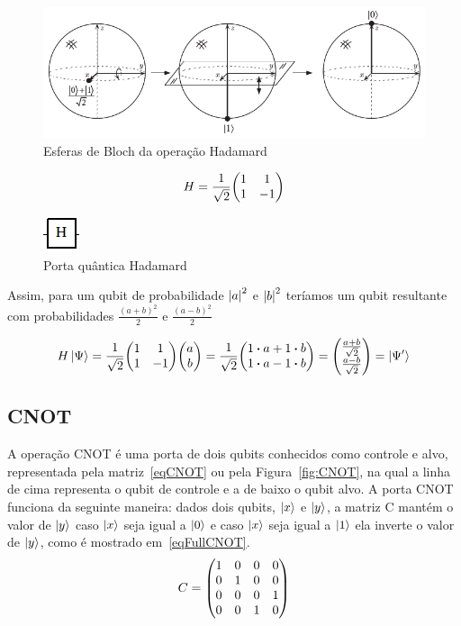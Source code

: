 \documentclass[a4paper, 12pt, oneside]{book}
\begin{document}
\begin{figure}[H]
\centering
\includegraphics[scale=0.6]{h_sphere.png}
\caption{Esferas de Bloch da operação Hadamard}
\label{fig:h_sphere}
\end{figure}

\begin{equation}\label{eqH}
H =  \frac{1}{\sqrt{2}}\mqty(1&1\\1&-1)
\end{equation}

\begin{figure}[H]
\centering
\includegraphics[scale=0.75]{h.jpg}
\caption{Porta quântica Hadamard}
\label{fig:H}
\end{figure}

Assim, para um qubit de probabilidade $\abs{a}^2$ e $\abs{b}^2$ teríamos um qubit resultante com probabilidades $\frac{(a+b)^2}{2}$ e $\frac{(a-b)^2}{2}$

\begin{equation}
H\ket{\Psi} = \frac{1}{\sqrt{2}}\mqty(1&1\\1&-1)\mqty(a\\b) = \frac{1}{\sqrt{2}}\mqty(1 \vdot a+1 \vdot b \\1 \vdot a-1 \vdot b) = \mqty( \frac{a+b}{\sqrt{2}} \\ \frac{a-b}{\sqrt{2}} ) = \ket{\Psi'}
\end{equation}

\subsection{CNOT} \label{sec:cnot}
A operação CNOT é uma porta de dois qubits conhecidos como controle e alvo, representada pela matriz~\eqref{eqCNOT} ou pela Figura~\ref{fig:CNOT}, na qual a linha de cima representa o qubit de controle e a de baixo o qubit alvo. A porta CNOT funciona da seguinte maneira: dados dois qubits, $\ket{x}$ e $\ket{y}$, a matriz C mantém o valor de $\ket{y}$ caso $\ket{x}$ seja igual a $\ket{0}$ e caso $\ket{x}$ seja igual a $\ket{1}$ ela inverte o valor de $\ket{y}$, como é mostrado em~\eqref{eqFullCNOT}.
\begin{equation}\label{eqCNOT}
C =  \mqty(1&0&0&0\\0&1&0&0\\0&0&0&1\\0&0&1&0)
\end{equation}
\end{document}
